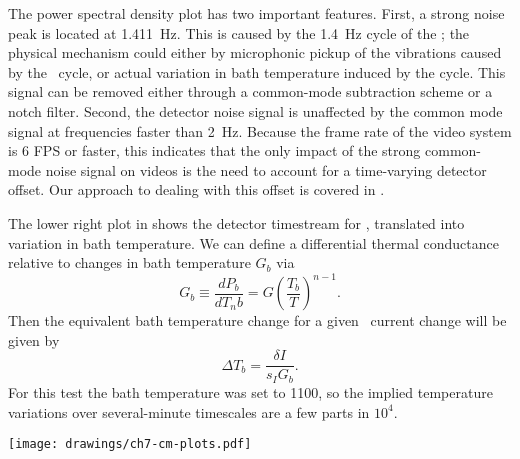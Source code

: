 The power spectral density plot has two important features.
First, a strong noise peak is located at \SI{1.411}{\Hz}.
This is caused by the \abt \SI{1.4}{\Hz} cycle of the \PTC; the physical mechanism could either by microphonic pickup of the vibrations caused by the \PTC\ cycle, or actual variation in bath temperature induced by the cycle.
This signal can be removed either through a common-mode subtraction scheme or a notch filter.
Second, the detector noise signal is unaffected by the common mode signal at frequencies faster than \SI{2}{\Hz}.
Because the frame rate of the video system is 6 FPS or faster, this indicates that the only impact of the strong common-mode noise signal on videos is the need to account for a time-varying detector offset.
Our approach to dealing with this offset is covered in .

The lower right plot in  shows the detector timestream for , translated into variation in bath temperature.
We can define a differential thermal conductance relative to changes in bath temperature $G_b$ via
\begin{equation}
  G_b \equiv \frac{dP_b}{d T_nb} = G \left( \frac{T_b}{T} \right)^{n-1}.
\end{equation}
Then the equivalent bath temperature change for a given \TES\ current change will be given by
\begin{equation}
  \Delta T_b = \frac{\delta I}{s_I G_b}.
\end{equation}
For this test the bath temperature was set to \SI{1100}{\mK}, so the implied temperature variations over several-minute timescales are a few parts in $10^{4}$.

\begin{figure*}
\texttt{[image: drawings/ch7-cm-plots.pdf]}
\caption{Plots summarizing common mode signal and $1/f$ noise.
\textbf{Upper Left}
Plow showing raw detector output for 15 detectors over a 10-minute data acquisition.
The data was acquired at \SI{15625}{\Hz}, but only every 100th data point is plotted.
\textbf{Upper Right} 
The same data after removal of the common mode signal (as defined in the text).
\textbf{Upper Left} 
Current noise power spectral density for the raw data, the raw data minus the common mode (``No CM''), the raw data minus the common mode and the best-fit 4th-order polynomial (``No CM, Poly''), and the common mode itself.
The strong noise peak at \SI{1.411}{\Hz} is due to the \PTC, as explained in the text.
\textbf{Lower Right} 
Raw timestream for , after conversion to an equivalent bath temperature variation, as described in the text.
}
\label{fig:ch7-cm-plots}
\end{figure*}

